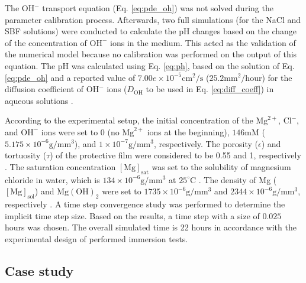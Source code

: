 The $\mathrm{OH}^{-}$ transport equation (Eq. \ref{eq:pde_oh}) was not solved during the parameter calibration process. Afterwards, two full simulations (for the NaCl and \gls{SBF} solutions) were conducted to calculate the pH changes based on the change of the concentration of $\mathrm{OH}^{-}$ ions in the medium. This acted as the validation of the numerical model because no calibration was performed on the output of this equation. The pH was calculated using Eq. \ref{eq:ph}, based on the solution of Eq. \ref{eq:pde_oh} and a reported value of $7.00e\times10^{-5} \mathrm{cm}^2/\mathrm{s}$ ($25.2 \mathrm{mm}^2/\mathrm{hour}$) for the diffusion coefficient of $\mathrm{OH}^{-}$ ions ($D_{\mathrm{OH}}$ to be used in Eq. \ref{eq:diff_coeff}) in aqueous solutions \cite{Lee2011}.

According to the experimental setup, the initial concentration of the $\mathrm{Mg}^{2+}$, $\mathrm{Cl}^{-}$, and $\mathrm{OH}^{-}$ ions were set to 0 (no $\mathrm{Mg}^{2+}$ ions at the beginning), $146 \mathrm{mM}$ ($5.175\times10^{-6} \mathrm{g}/\mathrm{mm}^3$), and $1\times10^{-7} \mathrm{g}/\mathrm{mm}^3$, respectively. The porosity ($\epsilon$) and tortuosity ($\tau$) of the protective film were considered to be 0.55 and 1, respectively \cite{Sun2012}. The saturation concentration $[\mathrm{Mg}]_{\mathrm{sat}}$ was set to the solubility of magnesium chloride in water, which is $134\times10^{-6}\mathrm{g}/\mathrm{mm}^3$ at $25^{\circ}\mathrm{C}$ \cite{GrahamC.Hill2001}. The density of Mg ($[\mathrm{Mg}]_{\mathrm{sol}}$) and $\mathrm{Mg(OH)}_2$ were set to $1735\times10^{-6}\mathrm{g}/\mathrm{mm}^3$ and $2344\times10^{-6}\mathrm{g}/\mathrm{mm}^3$, respectively \cite{Bajger2016}. A time step convergence study was performed to determine the implicit time step size. Based on the results, a time step with a size of $0.025$ hours was chosen. The overall simulated time is 22 hours in accordance with the experimental design of performed immersion tests.

\subsection{Case study}

